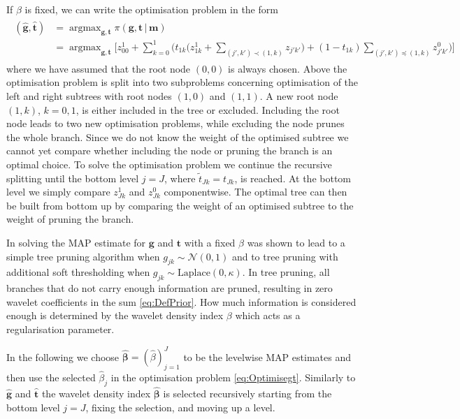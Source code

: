 \documentclass[11pt,a4paper]{article}
\newcommand{\g}{{\, |\,}}
\newcommand{\wt}{{\widetilde t}}
\newcommand{\Nn}{{\mathcal N}}
\DeclareMathOperator*{\argmax}{argmax}
\begin{document}
If $\beta$ is fixed, we can write the optimisation problem in the form
\begin{align}\label{eq:Optimisegt}
\begin{split}
(\hat{\boldsymbol{g}},\hat{\boldsymbol{t}}) & = \argmax_{\boldsymbol{g},\boldsymbol{t}} \pi(\boldsymbol{g},\boldsymbol{t}\g \boldsymbol{m})\\
& = \argmax_{\boldsymbol{g},\boldsymbol{t}} \Bigg[ z^1_{00}
 +\sum_{k=0}^1 \bigg( t_{1k}\Big(z^1_{1k}
 + \!\!\! \sum_{(j',k')\prec(1,k)} \!\!\! z_{j'k'}\Big)
 + (1-t_{1k}) \!\!\! \sum_{(j',k')\preceq(1,k)} \!\!\! z^0_{j'k'}\bigg)\Bigg]
\end{split}
\end{align}  
where we have assumed that the root node $(0,0)$ is always chosen. Above the optimisation problem is split into two subproblems concerning optimisation of the left and right subtrees with root nodes $(1,0)$ and $(1,1)$. A new root node $(1,k)$, $k=0,1$, is either included in the tree or excluded. Including the root node leads to two new optimisation problems, while excluding the node prunes the whole branch. Since we do not know the weight of the optimised subtree we cannot yet compare whether including the node or pruning the branch is an optimal choice. To solve the optimisation problem we continue the recursive splitting until the bottom level $j=J$, where $\wt_{Jk}=t_{Jk}$, is reached. At the bottom level we simply compare $z^1_{Jk}$ and $z^0_{Jk}$ componentwise. The optimal tree can then be built from bottom up by comparing the weight of an optimised subtree to the weight of pruning the branch. 

In \cite{Kekkonen2023} solving the MAP estimate for $\boldsymbol{g}$ and $\boldsymbol{t}$ with a fixed $\beta$ was shown to lead to a simple tree pruning algorithm when $g_{jk}\sim\Nn(0,1)$ and to tree pruning with additional soft thresholding when $g_{jk}\sim \text{Laplace}(0,\kappa)$. In tree pruning, all branches that do not carry enough information are pruned, resulting in zero wavelet coefficients in the sum \eqref{eq:DefPrior}. How much information is considered enough is determined by the wavelet density index $\beta$ which acts as a regularisation parameter. 

In the following we choose $\hat{\boldsymbol{\beta}}=(\hat{\beta})_{j=1}^J$ to be the levelwise MAP estimates and then use the selected $\hat{\beta}_j$ in the optimisation problem \eqref{eq:Optimisegt}. Similarly to $\hat{\boldsymbol{g}}$ and $\hat{\boldsymbol{t}}$ the wavelet density index $\hat{\boldsymbol{\beta}}$ is selected recursively starting from the  bottom level $j=J$, fixing the selection, and moving up a level.
\end{document}
